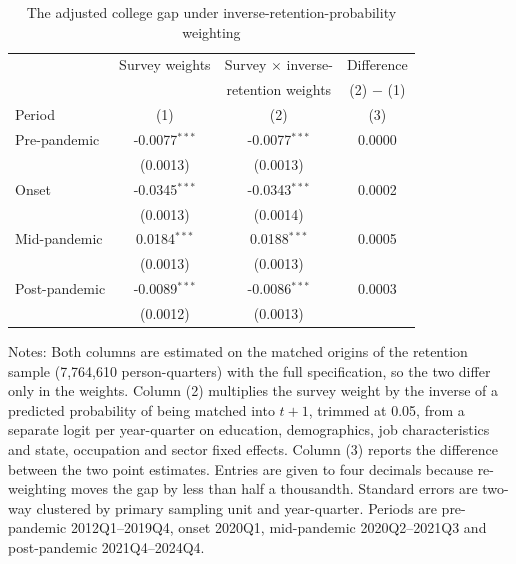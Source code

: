 \begin{table}[H]
\centering
\caption{The adjusted college gap under inverse-retention-probability weighting}
\label{tab:ipw}
\begin{threeparttable}
\begin{tabular}{lccc}
\toprule
& Survey weights & Survey $\times$ inverse- & Difference \\
& & retention weights & (2) $-$ (1) \\
Period & (1) & (2) & (3) \\
\midrule
Pre-pandemic & -0.0077$^{***}$ & -0.0077$^{***}$ & 0.0000 \\
 & (0.0013) & (0.0013) & \\
Onset & -0.0345$^{***}$ & -0.0343$^{***}$ & 0.0002 \\
 & (0.0013) & (0.0014) & \\
Mid-pandemic & 0.0184$^{***}$ & 0.0188$^{***}$ & 0.0005 \\
 & (0.0013) & (0.0013) & \\
Post-pandemic & -0.0089$^{***}$ & -0.0086$^{***}$ & 0.0003 \\
 & (0.0012) & (0.0013) & \\
\bottomrule
\end{tabular}
\begin{tablenotes}[flushleft]\footnotesize
\item Notes: Both columns are estimated on the matched origins of the retention sample (7,764,610 person-quarters) with the full specification, so the two differ only in the weights. Column (2) multiplies the survey weight by the inverse of a predicted probability of being matched into $t+1$, trimmed at 0.05, from a separate logit per year-quarter on education, demographics, job characteristics and state, occupation and sector fixed effects. Column (3) reports the difference between the two point estimates. Entries are given to four decimals because re-weighting moves the gap by less than half a thousandth. Standard errors are two-way clustered by primary sampling unit and year-quarter. Periods are pre-pandemic 2012Q1--2019Q4, onset 2020Q1, mid-pandemic 2020Q2--2021Q3 and post-pandemic 2021Q4--2024Q4.
\end{tablenotes}
\end{threeparttable}
\end{table}
